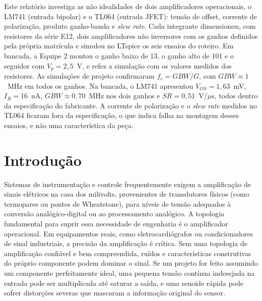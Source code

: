 \documentclass[11pt,a4paper]{article}
\begin{document}
\capa

\begin{resumo}
Este relatório investiga as não idealidades de dois amplificadores operacionais, o LM741 (entrada
bipolar) e o TL064 (entrada JFET): tensão de offset, corrente de polarização, produto ganho-banda
e \textit{slew rate}. Cada integrante dimensionou, com resistores da série E12, dois amplificadores
não inversores com os ganhos definidos pela própria matrícula e simulou no LTspice os seis ensaios
do roteiro. Em bancada, a Equipe 2 montou o ganho baixo de 13, o ganho alto de 101 e o seguidor com
$V_p=2{,}5$~V, e refez a simulação com os valores medidos dos resistores. As simulações de projeto
confirmaram $f_c=GBW/G$, com $GBW\approx1$~MHz em todos os ganhos. Na bancada, o LM741 apresentou
$V_{OS}=1{,}63$~mV, $I_B=16$~nA, $GBW\approx0{,}70$~MHz nos dois ganhos e
$SR=0{,}51$~V/$\mu$s, todos dentro da especificação do fabricante. A corrente de polarização e o
\textit{slew rate} medidos no TL064 ficaram fora da especificação, o que indica falha na montagem
desses ensaios, e não uma característica da peça.
\end{resumo}

\section{Introdução}

Sistemas de instrumentação e controle frequentemente exigem a amplificação de sinais elétricos na casa dos milivolts, provenientes de transdutores físicos (como termopares ou pontes de Wheatstone), para níveis de tensão adequados à conversão analógico-digital ou ao processamento analógico. A topologia fundamental para suprir essa necessidade de engenharia é o amplificador operacional. Em equipamentos reais, como eletrocardiógrafos ou condicionadores de sinal industriais, a precisão da amplificação é crítica. Sem uma topologia de amplificação confiável e bem compreendida, ruídos e características construtivas do próprio componente podem dominar o sinal. Se um projeto for feito assumindo um componente perfeitamente ideal, uma pequena tensão contínua indesejada na entrada pode ser multiplicada até saturar a saída, e uma senoide rápida pode sofrer distorções severas que mascaram a informação original do sensor.
\end{document}
